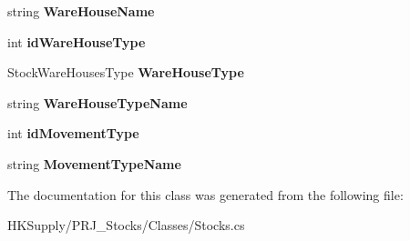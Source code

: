 \begin{DoxyCompactItemize}
\item 
\mbox{\label{class_h_k_supply_1_1_p_r_j___stocks_1_1_classes_1_1_stocks_1_1_stock_move_a712f155c744bdb42221a4a35a7dce6fa}} 
string {\bfseries Ware\+House\+Name}
\item 
\mbox{\label{class_h_k_supply_1_1_p_r_j___stocks_1_1_classes_1_1_stocks_1_1_stock_move_af9f61aa4ba45a7bdf50b774f3d82f84f}} 
int {\bfseries id\+Ware\+House\+Type}
\item 
\mbox{\label{class_h_k_supply_1_1_p_r_j___stocks_1_1_classes_1_1_stocks_1_1_stock_move_a9ae7e03f14fb48ed464f4afed4deecdd}} 
Stock\+Ware\+Houses\+Type {\bfseries Ware\+House\+Type}
\item 
\mbox{\label{class_h_k_supply_1_1_p_r_j___stocks_1_1_classes_1_1_stocks_1_1_stock_move_a8c3032ef9ba53a5965776ceeff27726f}} 
string {\bfseries Ware\+House\+Type\+Name}
\item 
\mbox{\label{class_h_k_supply_1_1_p_r_j___stocks_1_1_classes_1_1_stocks_1_1_stock_move_a7ce4ad1ba442b7694e678dd47cbd7e79}} 
int {\bfseries id\+Movement\+Type}
\item 
\mbox{\label{class_h_k_supply_1_1_p_r_j___stocks_1_1_classes_1_1_stocks_1_1_stock_move_abb4da606340908d4e4e6c36e6e20bb72}} 
string {\bfseries Movement\+Type\+Name}
\end{DoxyCompactItemize}


The documentation for this class was generated from the following file\+:\begin{DoxyCompactItemize}
\item 
H\+K\+Supply/\+P\+R\+J\+\_\+\+Stocks/\+Classes/Stocks.\+cs\end{DoxyCompactItemize}

